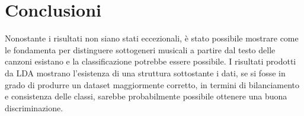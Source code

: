 \documentclass[technote]{IEEEtran}
\begin{document}
\section{Conclusioni}
Nonostante i risultati non siano stati eccezionali, \`e stato possibile
mostrare come le fondamenta per distinguere sottogeneri musicali a
partire dal testo delle canzoni esistano e la classificazione potrebbe
essere possibile. I risultati prodotti da LDA mostrano l'esistenza
di una struttura sottostante i dati, se si fosse in grado di
produrre un dataset maggiormente corretto, in termini di bilanciamento
e consistenza delle classi,  sarebbe probabilmente possibile
ottenere una buona discriminazione. 


\end{document}
